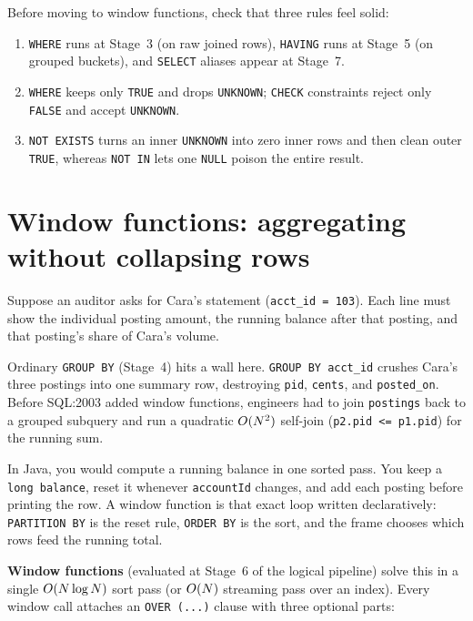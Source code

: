 \begin{recoverybox}
Before moving to window functions, check that three rules feel solid:
\begin{enumerate}
  \item \texttt{WHERE} runs at Stage~3 (on raw joined rows), \texttt{HAVING} runs at Stage~5 (on grouped buckets), and \texttt{SELECT} aliases appear at Stage~7.
  \item \texttt{WHERE} keeps only \texttt{TRUE} and drops \texttt{UNKNOWN}; \texttt{CHECK} constraints reject only \texttt{FALSE} and accept \texttt{UNKNOWN}.
  \item \texttt{NOT EXISTS} turns an inner \texttt{UNKNOWN} into zero inner rows and then clean outer \texttt{TRUE}, whereas \texttt{NOT IN} lets one \texttt{NULL} poison the entire result.
\end{enumerate}
\end{recoverybox}

\section{Window functions: aggregating without collapsing rows}
\label{sec:ch01-windows}

Suppose an auditor asks for Cara's statement (\texttt{acct\_id = 103}). Each line must show the individual posting amount, the running balance after that posting, and that posting's share of Cara's volume.

Ordinary \texttt{GROUP BY} (Stage~4) hits a wall here. \texttt{GROUP BY acct\_id} crushes Cara's three postings into one summary row, destroying \texttt{pid}, \texttt{cents}, and \texttt{posted\_on}. Before SQL:2003 added window functions, engineers had to join \texttt{postings} back to a grouped subquery and run a quadratic $O(N^2)$ self-join (\texttt{p2.pid <= p1.pid}) for the running sum.

In Java, you would compute a running balance in one sorted pass. You keep a \texttt{long balance}, reset it whenever \texttt{accountId} changes, and add each posting before printing the row. A window function is that exact loop written declaratively: \texttt{PARTITION BY} is the reset rule, \texttt{ORDER BY} is the sort, and the frame chooses which rows feed the running total.

\textbf{Window functions} (evaluated at Stage~6 of the logical pipeline) solve this in a single $O(N \log N)$ sort pass (or $O(N)$ streaming pass over an index). Every window call attaches an \texttt{OVER (...)} clause with three optional parts:


